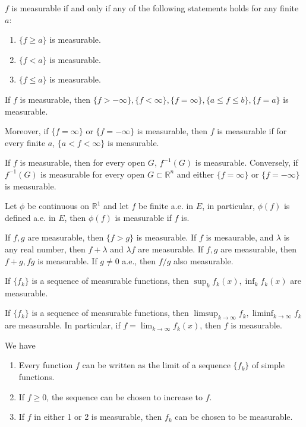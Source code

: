 \documentclass[openany]{book}
\newcommand{\R}{\mathbb{R}}
\begin{document}
\begin{prop}   
    $f$ is measurable if and only if any of the  following statements holds for any finite $a$:
    \begin{enumerate}
        \item $\{f\geq a\}$ is measurable.
        \item $\{f<a\}$ is measurable.
        \item $\{f\leq a\}$ is measurable.
    \end{enumerate}
\end{prop}
\begin{prop}
    If $f$ is measurable, then $\{f>-\infty\},\{f<\infty\}, \{f=\infty\},\{a\leq f\leq b\}, \{f=a\}$ is measurable.

    Moreover, if $\{f=\infty\}$ or $\{f=-\infty\}$ is measurable, then $f$ is measurable if for every finite $a$, $\{a<f<\infty\}$ is measurable.
\end{prop}
\begin{thm}
    If $f$ is measurable, then for every open $G$, $f^{-1}(G)$ is measurable. Conversely, if $f^{-1}(G)$ is measurable for every open $G\subset\R^n$ and either $\{f=\infty\}$ or $\{f=-\infty\}$ is measurable.
\end{thm}
\begin{thm}
    Let $\phi$ be continuous on $\R^1$ and let $f$ be finite a.e. in $E$, in particular, $\phi(f)$ is defined a.e. in $E$, then $\phi(f)$ is measurable if $f$ is.
\end{thm}
\begin{prop}
    If $f,g$ are measurable, then $\{f>g\}$ is measurable. If $f$ is mesaurable, and $\lambda$ is any real number, then $f+\lambda$ and $\lambda f$ are measurable. If $f,g$ are measurable, then $f+g, fg$ is measurable. If $g\neq 0$ a.e., then $f/g$ also measurable. 

    If $\{f_k\}$ is a sequence of measurable functions, then $\sup_kf_k(x), \inf_kf_k(x)$ are measurable.
\end{prop}
\begin{prop}
    If $\{f_k\}$ is a sequence of measurable functions, then $\limsup_{k\to\infty}f_k, \liminf_{k\to\infty}f_k$ are measurable. In particular, if $f=\lim_{k\to\infty}f_k(x)$, then $f$ is measurable.
\end{prop}
\begin{prop}
    We have 
    \begin{enumerate}
        \item Every function $f$ can be written as the limit of a sequence $\{f_k\}$ of simple functions.
        \item If $f\geq 0$, the sequence can be chosen to increase to $f$.
        \item If $f$ in either 1 or 2 is measurable, then $f_k$ can be chosen to be measurable.
    \end{enumerate}
\end{prop}
\end{document}
